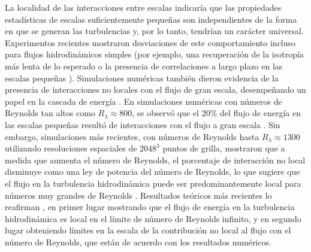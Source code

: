 La localidad de las interacciones entre escalas indicaría que las
propiedades estadísticas de escalas suficientemente pequeñas son
independientes de la forma en que se generan las turbulencias y, por
lo tanto, tendrían un carácter universal. Experimentos recientes
mostraron desviaciones de este comportamiento incluso para flujos
hidrodinámicos simples (por ejemplo, una recuperación de la isotropía
más lenta de lo esperado o la presencia de correlaciones a largo plazo
en las escalas pequeñas \cite{carlier_experimental_2001,
  poulain_dynamics_2006, shen_anisotropy_2000,
  wiltse_manipulation_1993, wiltse_direct_1998}). Simulaciones
numéricas también dieron evidencia de la presencia de interacciones no
locales con el flujo de gran escala, desempeñando un papel en la
cascada de energía \cite{alexakis_imprint_2005,
  domaradzki_analysis_1988, zhou_interacting_1993}. En simulaciones
numéricas con números de Reynolds tan altos como
$R_\lambda \approx 800$, se observó que el $20\%$ del flujo de energía
en las escalas pequeñas resultó de interacciones con el flujo a gran
escala \cite{mininni_large_2006}. Sin embargo, simulaciones más
recientes, con números de Reynolds hasta $R_\lambda \approx 1300$
utilizando resoluciones espaciales de $2048^3$ puntos de grilla,
mostraron que a medida que aumenta el número de Reynolds, el
porcentaje de interacción no local disminuye como una ley de potencia
del número de Reynolds, lo que sugiere que el flujo en la turbulencia
hidrodinámica puede ser predominantemente local para números muy
grandes de Reynolds \cite{mininni_nonlocal_2008}. Resultados teóricos
más recientes lo reafirman \cite{aluie_scale_2010,
  eyink_localness_2009}, en primer lugar mostrando que el flujo de
energía en la turbulencia hidrodinámica es local en el límite de
número de Reynolds infinito, y en segundo lugar obteniendo límites en
la escala de la contribución no local al flujo con el número de
Reynolds, que están de acuerdo con los resultados numéricos.

